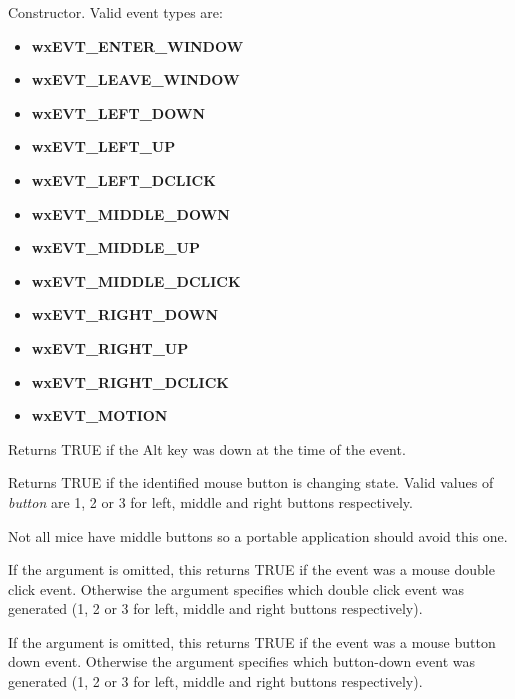 Constructor. Valid event types are:

\begin{itemize}
\itemsep=0pt
\item {\bf wxEVT\_ENTER\_WINDOW}
\item {\bf wxEVT\_LEAVE\_WINDOW}
\item {\bf wxEVT\_LEFT\_DOWN}
\item {\bf wxEVT\_LEFT\_UP}
\item {\bf wxEVT\_LEFT\_DCLICK}
\item {\bf wxEVT\_MIDDLE\_DOWN}
\item {\bf wxEVT\_MIDDLE\_UP}
\item {\bf wxEVT\_MIDDLE\_DCLICK}
\item {\bf wxEVT\_RIGHT\_DOWN}
\item {\bf wxEVT\_RIGHT\_UP}
\item {\bf wxEVT\_RIGHT\_DCLICK}
\item {\bf wxEVT\_MOTION}
\end{itemize}



Returns TRUE if the Alt key was down at the time of the event.



Returns TRUE if the identified mouse button is changing state. Valid
values of {\it button} are 1, 2 or 3 for left, middle and right
buttons respectively.

Not all mice have middle buttons so a portable application should avoid
this one.

\label{buttondclick}


If the argument is omitted, this returns TRUE if the event was a mouse
double click event. Otherwise the argument specifies which double click event
was generated (1, 2 or 3 for left, middle and right buttons respectively).



If the argument is omitted, this returns TRUE if the event was a mouse
button down event. Otherwise the argument specifies which button-down event
was generated (1, 2 or 3 for left, middle and right buttons respectively).

